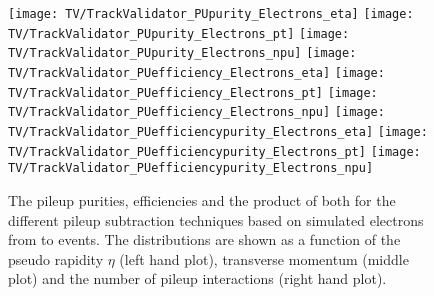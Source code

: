 \begin{figure}[h!t]
  \centering
  \texttt{[image: TV/TrackValidator\_PUpurity\_Electrons\_eta]}
  \texttt{[image: TV/TrackValidator\_PUpurity\_Electrons\_pt]}
  \texttt{[image: TV/TrackValidator\_PUpurity\_Electrons\_npu]}
  \newline
  \texttt{[image: TV/TrackValidator\_PUefficiency\_Electrons\_eta]}
  \texttt{[image: TV/TrackValidator\_PUefficiency\_Electrons\_pt]}
  \texttt{[image: TV/TrackValidator\_PUefficiency\_Electrons\_npu]}
  \newline
  \texttt{[image: TV/TrackValidator\_PUefficiencypurity\_Electrons\_eta]}
  \texttt{[image: TV/TrackValidator\_PUefficiencypurity\_Electrons\_pt]}
  \texttt{[image: TV/TrackValidator\_PUefficiencypurity\_Electrons\_npu]}
  \caption[Pileup purity, efficiency and their product for the different pileup subtraction techniques based on simulated electrons from \Zz to \EE events]{The pileup purities, efficiencies and the product of both for the different pileup subtraction techniques based on simulated electrons from \Zz to \EE events. The distributions are shown as a function of the pseudo rapidity $\eta$ (left hand plot), transverse momentum (middle plot) and the number of pileup interactions (right hand plot). \label{plot:TACOAElPileup}}
\end{figure}




